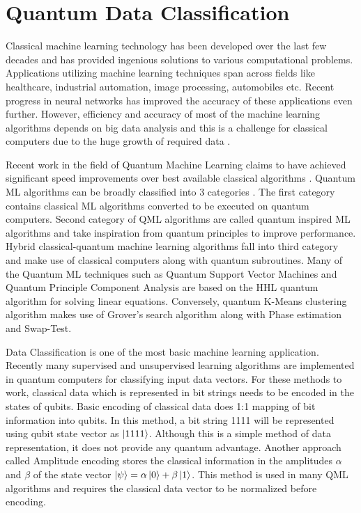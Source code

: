 \documentclass[english,a4paper,11pt,oneside,onecolumn]{book}
\begin{document}
\section{Quantum Data Classification}
\label{sec:qml}
Classical machine learning technology has been developed over the last few decades and has provided ingenious solutions to various computational problems. Applications utilizing machine learning techniques span across fields like healthcare, industrial automation, image processing, automobiles etc. Recent progress in neural networks has improved the accuracy of these applications even further. However, efficiency and accuracy of most of the machine learning algorithms depends on big data analysis and this is a challenge for classical computers due to the huge growth of required data \cite{voss_2016_why}.\par
Recent work in the field of Quantum Machine Learning claims to have achieved significant speed improvements over best available classical algorithms \cite{schuld_2020_circuitcentric}. Quantum ML algorithms can be broadly classified into 3 categories \cite{zhang_2020_recent}. The first category contains classical ML algorithms converted to be executed on quantum computers. Second category of QML algorithms are called quantum inspired ML algorithms and take inspiration from quantum principles to improve performance. Hybrid classical-quantum machine learning algorithms fall into third category and make use of classical computers along with quantum subroutines. Many of the Quantum ML techniques such as Quantum Support Vector Machines and Quantum Principle Component Analysis \cite{lloyd_2014_quantum} are based on the HHL quantum algorithm for solving linear equations. Conversely, quantum K-Means clustering algorithm makes use of Grover's search algorithm along with Phase estimation and Swap-Test.\par
Data Classification is one of the most basic machine learning application. Recently many supervised and unsupervised learning algorithms are implemented in quantum computers for classifying input data vectors. For these methods to work, classical data which is represented in bit strings needs to be encoded in the states of qubits. Basic encoding of classical data does 1:1 mapping of bit information into qubits. In this method, a bit string 1111 will be represented using qubit state vector as \(\ket{1111}\). Although this is a simple method of data representation, it does not provide any quantum advantage. Another approach called Amplitude encoding \cite{schuld_2020_circuitcentric} stores the classical information in the amplitudes $\alpha$ and $\beta$ of the state vector $\ket{\psi} = \alpha\ket{0} + \beta\ket{1}$. This method is used in many QML algorithms and requires the classical data vector to be normalized before encoding.\par
\end{document}
